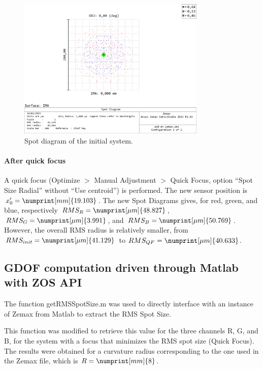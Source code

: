 \documentclass[10pt,letterpaper]{article}
\begin{document}
\begin{figure}[h]
    \centering
    \includegraphics[width=0.8\textwidth]{IO25_TP4_SpotDiagram_init_2000.png}
    \caption{Spot diagram of the initial system.}
    \label{fig:Spot_diag_init}
\end{figure}

\paragraph{After quick focus\\} \label{manual-qf}
A quick focus (Optimize $>$ Manual Adjustment $>$ Quick Focus, option “Spot Size Radial” without “Use centroid”) is performed. The new sensor position is $x'_0 = \numprint[mm]{19.103}$. The new Spot Diagrams gives, for red, green, and blue, respectively $RMS_R = \numprint[\mu m]{48.827}$, $RMS_G = \numprint[\mu m]{3.991}$, and $RMS_B = \numprint[\mu m]{50.769}$. However, the overall RMS radius is relatively smaller, from $RMS_{init} = \numprint[\mu m]{41.129}$ to $RMS_{QF} = \numprint[\mu m]{40.633}$.



\subsection{GDOF computation driven through Matlab with ZOS API}

The function get\textunderscore RMS\textunderscore SpotSize.m was used to directly interface with an instance of Zemax from Matlab to extract the RMS Spot Size. 

This function was modified to retrieve this value for the three channels R, G, and B, for the system with a focus that minimizes the RMS spot size (Quick Focus). The results were obtained for a curvature radius corresponding to the one used in the Zemax file, which is $R= \numprint[mm]{8}$. 
\end{document}
